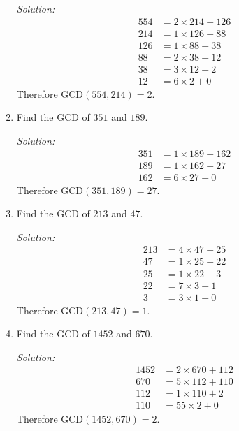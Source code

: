\documentclass[16pt]{article}
\theoremstyle{remark}
\begin{document}
\begin{enumerate}
\begin{mdframed}[style=TheoremFrame]
\textit{Solution:}
\begin{align*}
554 &= 2 \times 214 + 126\\
214 &= 1 \times 126 + 88\\
126 &= 1 \times 88 + 38\\
88 &= 2 \times 38 + 12\\
38 &= 3 \times 12 + 2\\
12 &= 6 \times 2 + 0
\end{align*}
Therefore GCD$(554,214)=2$.
\end{mdframed}
\item Find the GCD of $351$ and $189$.
\begin{mdframed}[style=TheoremFrame]
\textit{Solution:}
\begin{align*}
351 &= 1 \times 189 + 162\\
189 &= 1\times 162 + 27\\
162 &= 6 \times 27 + 0
\end{align*}
Therefore GCD$(351,189)=27$.
\end{mdframed}
\newpage
\item Find the GCD of $213$ and $47$.
\begin{mdframed}[style=TheoremFrame]
\textit{Solution:}
\begin{align*}
213 &= 4 \times 47 + 25\\
47 &= 1 \times 25 + 22\\
25 &= 1 \times 22 + 3\\
22 &= 7 \times 3 + 1\\
3 &= 3 \times 1 + 0
\end{align*}
Therefore GCD$(213,47)=1$.
\end{mdframed}
\item Find the GCD of $1452$ and $670$.
\begin{mdframed}[style=TheoremFrame]
\textit{Solution:}
\begin{align*}
1452 &= 2 \times 670 + 112\\
670 &= 5 \times 112 + 110\\
112 &= 1 \times 110 + 2\\
110 &= 55 \times 2 + 0
\end{align*}
Therefore GCD$(1452,670)=2$.
\end{mdframed}
\end{enumerate}
\end{document}

